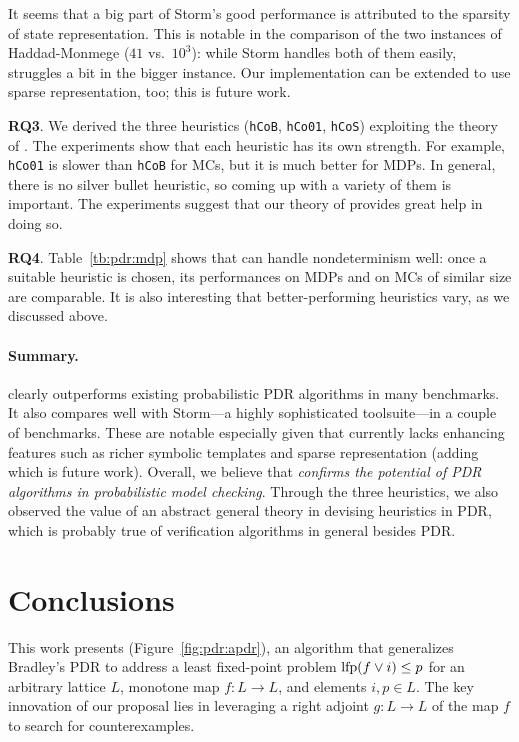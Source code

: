 It seems that a big part of Storm's good performance is attributed to the sparsity of state representation. This is notable in the comparison of the two instances of Haddad-Monmege ($41$ vs.\ $10^3$): while Storm handles both of them easily, \ADPDR{} struggles a bit in the bigger instance. Our implementation can be extended to use sparse representation, too; this is future work.

\textbf{RQ3}.
We derived the three heuristics (\verb|hCoB|, \verb|hCo01|, \verb|hCoS|) exploiting the theory of \ADPDR{}. The experiments show that each heuristic has its own strength. For example, \verb|hCo01| is slower than \verb|hCoB| for MCs, but it is much better for MDPs. In general, there is no silver bullet heuristic, so coming up with a variety of them is important. The experiments suggest that our theory of \ADPDR{} provides great help in doing so.

\textbf{RQ4}.
Table~\ref{tb:pdr:mdp} shows that \ADPDR{} can handle nondeterminism well: once a suitable heuristic is chosen, its performances on MDPs and on MCs of similar size are comparable. It is also interesting that better-performing heuristics vary, as we discussed above.

\paragraph{Summary.}
\ADPDR{} clearly outperforms existing probabilistic PDR algorithms in many benchmarks. It also compares well with Storm---a highly sophisticated toolsuite---in a couple of benchmarks. These are notable especially given that \ADPDR{} currently lacks enhancing features such as richer symbolic templates and sparse representation (adding which is future work). Overall, we believe that \ADPDR{} \emph{confirms the potential of PDR algorithms in probabilistic model checking}. Through the three heuristics, we also observed the value of an abstract general theory in devising heuristics in PDR, which is probably true of verification algorithms in general besides PDR.

\section{Conclusions}\label{sec:pdr:conclusions}
This work presents \APDR{} (Figure~\ref{fig:pdr:apdr}), an algorithm that generalizes Bradley's PDR \cite{Bradley11} to address a least fixed-point problem $\text{lfp}(f\lor i) \le p$ for an arbitrary lattice $L$, monotone map $f\colon L\to L$, and elements $i,p \in L$. The key innovation of our proposal lies in leveraging a right adjoint $g\colon L \to L$ of the map $f$ to search for counterexamples.

